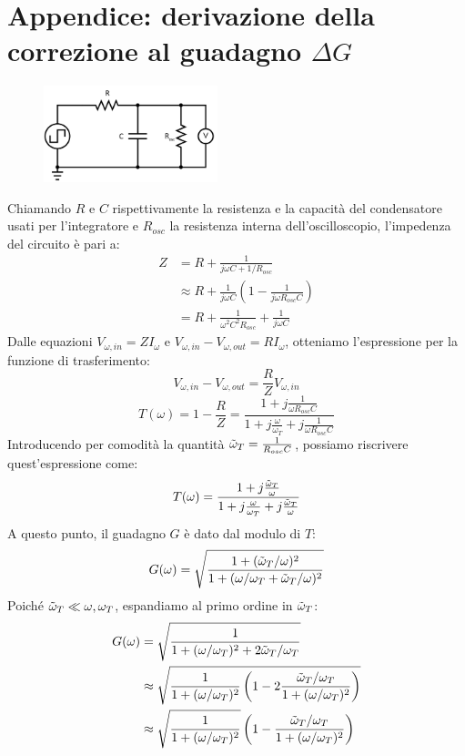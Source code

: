 \documentclass{article}[a4paper, oneside,11pt]
\begin{document}
\section{Appendice: derivazione della correzione al guadagno $\Delta G$}
    \begin{figure}[H]
        \centering
        \includegraphics[width=0.45\textwidth]{img/circuito.png}
    \end{figure}
    Chiamando $R$ e $C$ rispettivamente la resistenza e la capacità del condensatore usati per l'integratore e $R_{osc}$ la resistenza interna dell'oscilloscopio, l'impedenza del circuito è pari a:
    \begin{align*} 
    Z &= R + \frac{1}{j\omega C + 1/R_{osc}} \\
    &\approx R + \frac{1}{j\omega C}\left(1-\frac{1}{j\omega R_{osc}C}\right)\\
    &= R + \frac{1}{\omega^2C^2R_{osc}} + \frac{1}{j\omega C}
    \end{align*}
    Dalle equazioni $V_{\omega, in} = Z I_{\omega}$ e $V_{\omega, in}-V_{\omega, out} = RI_{\omega}$, otteniamo l'espressione per la funzione di trasferimento:
    \[V_{\omega, in}-V_{\omega, out} = \frac{R}{Z} V_{\omega, in}\]
    \[T(\omega) = 1-\frac{R}{Z} = \frac{1+j\frac{1}{\omega R_{osc}C}}{1+j\frac{\omega}{\omega_T} + j\frac{1}{\omega R_{osc}C}}\]
    Introducendo per comodità la quantità $\Tilde{\omega}_T = \frac{1}{R_{osc}C}$, possiamo riscrivere quest'espressione come:
    \[T(\omega)=\frac{1 + j\frac{\Tilde{\omega}_T}{\omega}}{1 + j\frac{\omega}{\omega_T} + j\frac{\Tilde{\omega}_T}{\omega}}\]
    A questo punto, il guadagno $G$ è dato dal modulo di $T$:
    \[G(\omega)=\sqrt{\frac{1+(\Tilde{\omega}_T/\omega)^2}{1+ (\omega/\omega_T + \Tilde{\omega}_T/\omega)^2}}\]
    Poiché $\Tilde{\omega}_T\ll \omega,\omega_T$, espandiamo al primo ordine in $\Tilde{\omega}_T$:
    \begin{align*}
    G(\omega) &= \sqrt{\frac{1}{1+(\omega/\omega_T)^2 + 2\Tilde{\omega}_T/\omega_T}}\\
    &\approx \sqrt{\frac{1}{1+(\omega/\omega_T)^2}\left(1-2\frac{\Tilde{\omega}_T/\omega_T}{1+(\omega/\omega_T)^2}\right)}\\
    &\approx \sqrt{\frac{1}{1+(\omega/\omega_T)^2}} \left(1 - \frac{\Tilde{\omega}_T/\omega_T}{1+(\omega/\omega_T)^2}\right)
    \end{align*}
\end{document}
